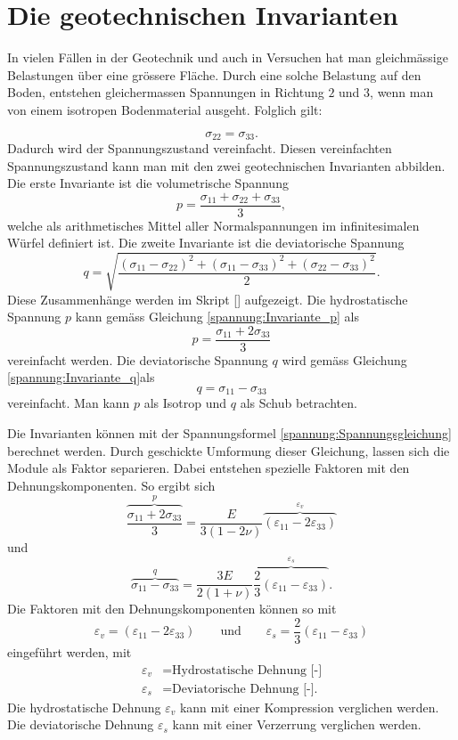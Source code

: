 \section{Die geotechnischen Invarianten\label{spannung:section:Die geotechnischen Invarianten}}
In vielen Fällen in der Geotechnik und auch in Versuchen hat man gleichmässige Belastungen über eine grössere Fläche.
Durch eine solche Belastung auf den Boden, entstehen gleichermassen Spannungen in Richtung $2$ und $3$,
wenn man von einem isotropen Bodenmaterial ausgeht.
Folglich gilt:

\[
\sigma_{22}
=
\sigma_{33}
.
\]
Dadurch wird der Spannungszustand vereinfacht.
Diesen vereinfachten Spannungszustand kann man mit den zwei geotechnischen Invarianten abbilden.
Die erste Invariante ist die volumetrische Spannung
\begin{equation}
p
=
\frac{\sigma_{11}+\sigma_{22}+\sigma_{33}}{3}
\label{spannung:Invariante_p}
,
\end{equation}
welche als arithmetisches Mittel aller Normalspannungen im infinitesimalen Würfel definiert ist.
Die zweite Invariante ist die deviatorische Spannung
\begin{equation}
q
=
\sqrt{\frac{(\sigma_{11}-\sigma_{22})^{2}+(\sigma_{11}-\sigma_{33})^{2}+(\sigma_{22}-\sigma_{33})^{2}}{2}}
\label{spannung:Invariante_q}
.
\end{equation}
Diese Zusammenhänge werden im Skript [\cite{spannung:Stoffgesetze-und-numerische-Modellierung-in-der-Geotechnik}] aufgezeigt.
Die hydrostatische Spannung $p$ kann gemäss Gleichung \eqref{spannung:Invariante_p} als
\[
p
=
\frac{\sigma_{11}+2\sigma_{33}}{3}
\]
vereinfacht werden.
Die deviatorische Spannung $q$ wird gemäss Gleichung \eqref{spannung:Invariante_q}als
\[
q
=
\sigma_{11}-\sigma_{33}
\]
vereinfacht. Man kann $p$ als Isotrop und $q$ als Schub betrachten.

Die Invarianten können mit der Spannungsformel \eqref{spannung:Spannungsgleichung} berechnet werden.
Durch geschickte Umformung dieser Gleichung, lassen sich die Module als Faktor separieren.
Dabei entstehen spezielle Faktoren mit den Dehnungskomponenten.
So ergibt sich
\[
\overbrace{\frac{\sigma_{11}+2\sigma_{33}}{3}}^{p}
=
\frac{E}{3(1-2\nu)} \overbrace{(\varepsilon_{11} - 2\varepsilon_{33})}^{\varepsilon_{v}}
\]
und
\[
\overbrace{\sigma_{11}-\sigma_{33}}^{q}
=
\frac{3E}{2(1+\nu)} \overbrace{\frac{2}{3}(\varepsilon_{11} - \varepsilon_{33})}^{\varepsilon_{s}}
.
\]
Die Faktoren mit den Dehnungskomponenten können so mit
\[
\varepsilon_{v}
=
(\varepsilon_{11} - 2\varepsilon_{33})
\qquad
\text{und}
\qquad
\varepsilon_{s}
=
\frac{2}{3}(\varepsilon_{11} - \varepsilon_{33})
\]
eingeführt werden, mit
\begin{align*}
	\varepsilon_{v} &= \text{Hydrostatische Dehnung [-]} \\
	\varepsilon_{s} &= \text{Deviatorische Dehnung [-].}
\end{align*}
Die hydrostatische Dehnung $\varepsilon_{v}$ kann mit einer Kompression verglichen werden.
Die deviatorische Dehnung $\varepsilon_{s}$  kann mit einer Verzerrung verglichen werden.

